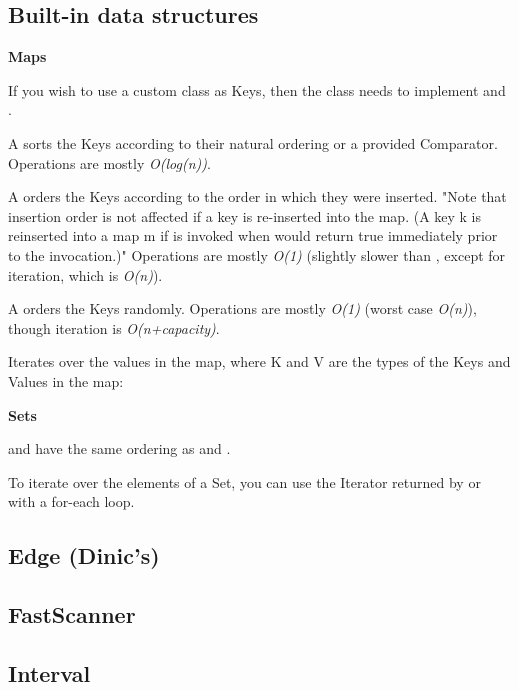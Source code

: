 
\subsection*{Built-in data structures}

\textbf{Maps}

If you wish to use a custom class as Keys, then the class needs to implement  and .

A  sorts the Keys according to their natural ordering or a provided Comparator. Operations are mostly \textit{O(log(n))}.

A  orders the Keys according to the order in which they were inserted. "Note that insertion order is not affected if a key is re-inserted into the map. (A key k is reinserted into a map m if  is invoked when  would return true immediately prior to the invocation.)" Operations are mostly \textit{O(1)} (slightly slower than , except for iteration, which is \textit{O(n)}).

A  orders the Keys randomly. Operations are mostly \textit{O(1)} (worst case \textit{O(n)}), though iteration is \textit{O(n+capacity)}.

Iterates over the values in the map, where K and V are the types of the Keys and Values in the map:



\textbf{Sets}

 and  have the same ordering as  and .

To iterate over the elements of a Set, you can use the Iterator returned by  or with a for-each loop.

\subsection*{Edge (Dinic's)}



\subsection*{FastScanner}



\subsection*{Interval}




%

\newpage